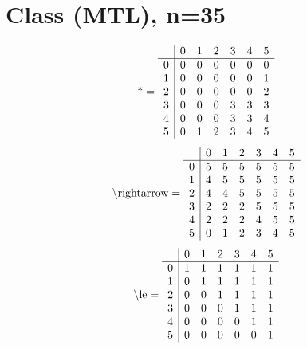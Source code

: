 \documentclass[11pt]{article}
\begin{document}
\section{Class (MTL), n=35}
\[\text{*} = 
\begin{array}{r | r r r r r r}
 & 0 & 1 & 2 & 3 & 4 & 5 \\ \hline
0 & 0 & 0 & 0 & 0 & 0 & 0 \\
1 & 0 & 0 & 0 & 0 & 0 & 1 \\
2 & 0 & 0 & 0 & 0 & 0 & 2 \\
3 & 0 & 0 & 0 & 3 & 3 & 3 \\
4 & 0 & 0 & 0 & 3 & 3 & 4 \\
5 & 0 & 1 & 2 & 3 & 4 & 5 \\
\end{array}
\]
\[\text{\textbackslash rightarrow} = 
\begin{array}{r | r r r r r r}
 & 0 & 1 & 2 & 3 & 4 & 5 \\ \hline
0 & 5 & 5 & 5 & 5 & 5 & 5 \\
1 & 4 & 5 & 5 & 5 & 5 & 5 \\
2 & 4 & 4 & 5 & 5 & 5 & 5 \\
3 & 2 & 2 & 2 & 5 & 5 & 5 \\
4 & 2 & 2 & 2 & 4 & 5 & 5 \\
5 & 0 & 1 & 2 & 3 & 4 & 5 \\
\end{array}
\]
\[\text{\textbackslash le} = 
\begin{array}{r | r r r r r r}
 & 0 & 1 & 2 & 3 & 4 & 5 \\ \hline
0 & 1 & 1 & 1 & 1 & 1 & 1 \\
1 & 0 & 1 & 1 & 1 & 1 & 1 \\
2 & 0 & 0 & 1 & 1 & 1 & 1 \\
3 & 0 & 0 & 0 & 1 & 1 & 1 \\
4 & 0 & 0 & 0 & 0 & 1 & 1 \\
5 & 0 & 0 & 0 & 0 & 0 & 1 \\
\end{array}
\]
\end{document}
